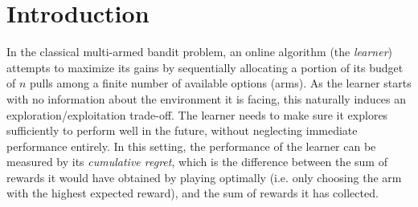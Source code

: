 \documentclass[final,12pt]{colt2018}
\begin{document}
\section{Introduction}
In the classical multi-armed bandit problem, an online algorithm (the \emph{learner}) attempts to maximize its gains by sequentially allocating a portion of its budget of $n$ pulls among a finite number of available options (arms). As the learner starts with no information about the environment it is facing, this naturally induces an exploration/exploitation trade-off. The learner needs to make sure it explores sufficiently to perform well in the future, without neglecting immediate performance entirely. In this setting, the performance of the learner can be measured by its \emph{cumulative regret}, which is the difference between the sum of rewards it would have obtained by playing optimally (i.e. only choosing the arm with the highest expected reward), and the sum of rewards it has collected. \\
\end{document}
